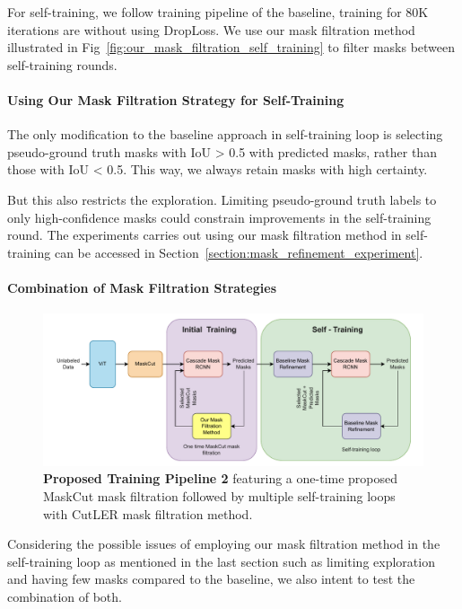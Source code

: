  For self-training, we follow training pipeline of the baseline, training for 80K iterations are without using DropLoss. We use our mask filtration method illustrated in Fig~\ref{fig:our_mask_filtration_self_training} to filter masks between self-training rounds. 
 
\paragraph{Using Our Mask Filtration Strategy for Self-Training}
\label{para:our_mask_filtration}
The only modification to the baseline approach in self-training loop is selecting pseudo-ground truth masks with IoU > 0.5 with predicted masks, rather than those with IoU < 0.5. This way, we always retain masks with high certainty. 

But this also restricts the exploration. Limiting pseudo-ground truth labels to only high-confidence masks could constrain improvements in the self-training round. The experiments carries out using our mask filtration method in self-training can be accessed in Section~\ref{section:mask_refinement_experiment}.
 
\paragraph{Combination of Mask Filtration Strategies}
\begin{figure}
	\centering
	\includegraphics[width=1\textwidth]{Images/main/our_approach.pdf}
	\caption[\textbf{Proposed Training Pipeline 2}]{\textbf{Proposed Training Pipeline 2} featuring a one-time proposed MaskCut mask filtration followed by multiple self-training loops with CutLER mask filtration method.}
	\label{fig:proposed_training_new}
\end{figure}

Considering the possible issues of employing our mask filtration method in the self-training loop as mentioned in the last section such as limiting exploration and having few masks compared to the baseline, we also intent to test the combination of both. 

